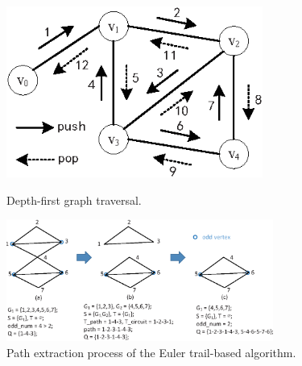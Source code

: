 \begin{figure}[t]
    \centering
    \begin{minipage}[b]{0.345\textwidth}
        \centering
        \includegraphics[width=0.75\textwidth]{figure/graph.eps} 
        \vspace{-0.2cm}
        \caption{Depth-first graph traversal.}\label{fig:graph}
    \end{minipage}
    \hspace{0.0in}
    \begin{minipage}[b]{0.64\textwidth}
        \centering
        \includegraphics[width=0.78\textwidth]{figure/euler.eps}
        \vspace{-0.2cm}
        \caption{Path extraction process of the Euler trail-based algorithm.}\label{fig:euler}
    \end{minipage}
    \vspace{-0.45cm}
\end{figure}









